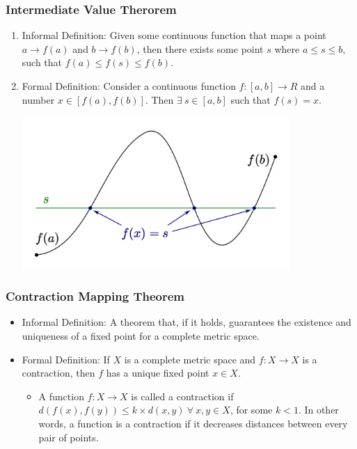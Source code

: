 \documentclass{article}
\begin{document}
\subsubsection{Intermediate Value Therorem}
\begin{enumerate}
    \item Informal Definition: Given some continuous function that maps a point 
    $ a \rightarrow f(a) $ and $ b \rightarrow f(b) $, then there exists some 
    point $ s $ where $ a \le s \le b $, such that $ f(a) \le f(s) \le f(b) $.
    \item Formal Definition: Consider a continuous function $ f: [a,b] 
    \rightarrow R $ and a number $ x \in [f(a), f(b)] $. Then $ \exists\ s \in 
    [a, b] $ such that $ f(s) = x $.  
    \begin{center}
        \includegraphics[width=0.8\textwidth]{imgs/intermediate_value_thm.png} \\
    \end{center}
\end{enumerate}

\subsubsection{Contraction Mapping Theorem}
\begin{itemize}
    \item Informal Definition: A theorem that, if it holds, guarantees the 
    existence and uniqueness of a fixed point for a complete metric space. 
    \item Formal Definition: If $ X $ is a complete metric space and $ f: X 
    \rightarrow X $ is a contraction, then $ f $ has a unique fixed point $ x 
    \in X $. 
    \begin{itemize}
        \item A function $ f: X \rightarrow X $ is called a contraction if $
        d(f(x), f(y)) \le k \times d(x, y) \ \forall \ x,y \in X $, for some $
        k < 1 $. In other words, a function is a contraction if it decreases 
        distances between every pair of points. 
    \end{itemize}
\end{itemize}
\end{document}
